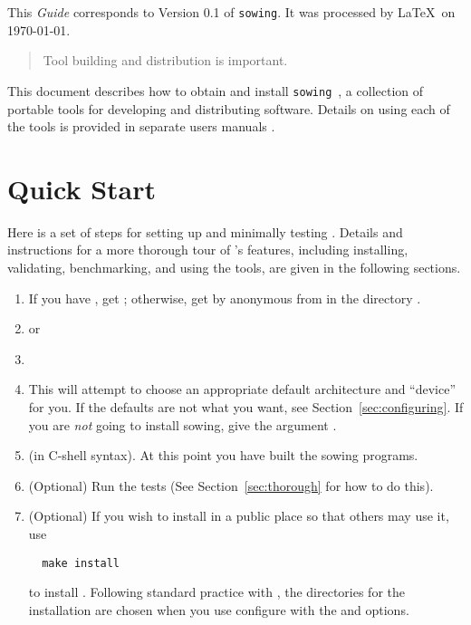 \documentclass[11pt,twoside]{article}
\begin{document}

\clearpage
{}
\setcounter{page}{3}
\pagestyle{plain}
{\parskip=0pt
\tableofcontents
\bigskip
\bigskip
This {\em Guide\/} corresponds to Version 0.1 of {\tt sowing}.  It was
processed by \LaTeX\ on \today.
\clearpage
}
\setcounter{page}{1}

\begin{abstract}
 Tool building and distribution is important.
\end{abstract}

This document describes how to obtain and install
\texttt{sowing}~\cite{sowing}, a collection of portable tools for developing
and 
distributing software.  Details on using each of the tools is provided in
separate users manuals \cite{bfort,doctext,tohtml}.

\section{Quick Start}
\label{sec:quickstart}

Here is a set of steps for setting up and minimally testing .
Details and instructions for a more thorough tour of 's features,
including installing, validating, benchmarking, and using the tools, are given
in the following sections.  
\begin{enumerate}
\item If you have , get ; otherwise, get 
 by anonymous  from
   in the directory .
\item {} or 
\item {}
\item {}  This will attempt to choose an appropriate default
  architecture and ``device'' for you.  If the defaults are not what you want,
  see Section~\ref{sec:configuring}.  If you are \emph{not} going to install
  sowing, give  the argument .
\item {} (in C-shell syntax).  
At this point you have built the sowing programs.  
\item (Optional)  Run the tests
  (See Section~\ref{sec:thorough} for how to do this).  
\item (Optional)  If you wish to install  in a public place so
  that others may use it, use
\begin{verbatim}
  make install
\end{verbatim}
to install .  Following standard practice with ,
the directories for the installation are chosen when you use configure with
the  and  options.
\end{enumerate}
\end{document}
